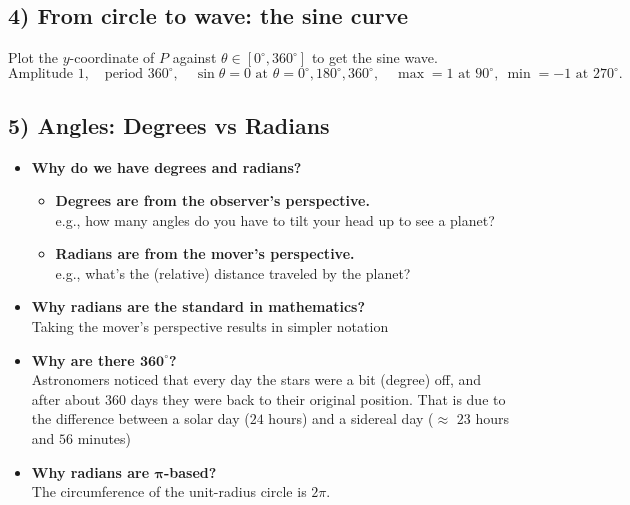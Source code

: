 \documentclass{article}
\begin{document}
\begin{figure}[ht]
\end{figure}


\subsection*{4) From circle to wave: the sine curve}
Plot the \(y\)-coordinate of \(P\) against \(\theta\in[0^\circ,360^\circ]\) to get the sine wave.
\[
\text{Amplitude }1,\quad \text{period }360^\circ,\quad
\sin\theta=0 \text{ at } \theta=0^\circ,180^\circ,360^\circ, \quad
\max=1 \text{ at } 90^\circ,\ \min=-1 \text{ at } 270^\circ.
\]

\subsection*{5) Angles: Degrees vs Radians}
\begin{minipage}{0.5\textwidth}
    \vspace{-5.4cm}
    \begin{itemize}[leftmargin = 0.3cm, label = $\bullet$, rightmargin = 0cm]
        \item \textbf{}\textbf{Why do we have degrees and radians?} 
        \begin{itemize}[leftmargin = 0.3cm, label = $\bullet$, rightmargin = 0cm]
            \item[] \textbf{Degrees are from the observer's perspective.} \\
            \noindent e.g., how many angles do you have to tilt your head up to see a planet?
            \item[] \textbf{Radians are from the mover's perspective.} \\
            \noindent e.g., what's the (relative) distance traveled by the planet?
        \end{itemize}
                            
        \item \textbf{Why radians are the standard in mathematics?} \\
        Taking the mover's perspective results in simpler notation
        
        \item \textbf{Why are there $\pmb{360^\circ}$?} \\
        Astronomers noticed that every day the stars were a bit (degree) off, and after about $360$ days they were back to their original position. That is due to the difference between a solar day ($24$ hours) and a sidereal day ($\approx$ $23$ hours and $56$ minutes)

        \item \textbf{Why radians are $\pmb{\pi}$-based?} \\
        The circumference of the unit-radius circle is $2\pi$.
    \end{itemize}    
\end{minipage}
\end{document}
